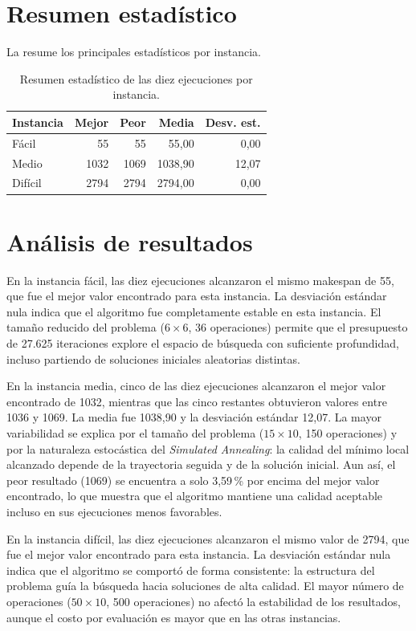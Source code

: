 \section{Resumen estadístico}

La  resume los principales estadísticos por instancia.

\begin{table}[htbp]
\centering
\begin{tabular}{lrrrr}
\toprule
Instancia & Mejor & Peor & Media & Desv. est. \\
\midrule
Fácil   & 55   & 55   & 55,00   & 0,00  \\
Medio   & 1032 & 1069 & 1038,90 & 12,07 \\
Difícil & 2794 & 2794 & 2794,00 & 0,00  \\
\bottomrule
\end{tabular}
\caption{Resumen estadístico de las diez ejecuciones por instancia.}
\label{tab:resumen}
\end{table}

\section{Análisis de resultados}

En la instancia fácil, las diez ejecuciones alcanzaron el mismo makespan de 55,
que fue el mejor valor encontrado para esta instancia.
La desviación estándar nula indica que el algoritmo fue completamente estable en esta instancia.
El tamaño reducido del problema (\(6\times6\), 36 operaciones)
permite que el presupuesto de 27.625 iteraciones explore el espacio de búsqueda con suficiente profundidad,
incluso partiendo de soluciones iniciales aleatorias distintas.

En la instancia media, cinco de las diez ejecuciones alcanzaron el mejor valor encontrado de 1032,
mientras que las cinco restantes obtuvieron valores entre 1036 y 1069.
La media fue 1038,90 y la desviación estándar 12,07.
La mayor variabilidad se explica por el tamaño del problema (\(15\times10\), 150 operaciones)
y por la naturaleza estocástica del \emph{Simulated Annealing}:
la calidad del mínimo local alcanzado depende de la trayectoria seguida y de la solución inicial.
Aun así, el peor resultado (1069) se encuentra a solo 3,59\,\% por encima del mejor valor encontrado,
lo que muestra que el algoritmo mantiene una calidad aceptable incluso en sus ejecuciones menos favorables.

En la instancia difícil, las diez ejecuciones alcanzaron el mismo valor de 2794,
que fue el mejor valor encontrado para esta instancia.
La desviación estándar nula indica que el algoritmo se comportó de forma consistente:
la estructura del problema guía la búsqueda hacia soluciones de alta calidad.
El mayor número de operaciones (\(50\times10\), 500 operaciones)
no afectó la estabilidad de los resultados, aunque el costo por evaluación es mayor que en las otras instancias.

